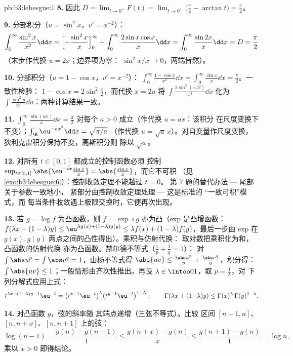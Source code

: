 \begin{solution}{pb:b3:lebesgue:1}
\textbf{8.} 因此 $D = \lim_{t\to0^+}F(t) =
\lim_{t\to0^+}\bigl(\frac\pi2 - \arctan t\bigr) =
\frac\pi2$。

\textbf{9.} 分部积分（$u = \sin^2x$，$v' = x^{-2}$）：
\[
\int_0^\infty\frac{\sin^2x}{x^2}\dd x
= \Bigl[-\frac{\sin^2x}{x}\Bigr]_0^\infty +
\int_0^\infty\frac{2\sin x\cos x}{x}\dd x
= \int_0^\infty\frac{\sin 2x}{x}\dd x = D = \frac\pi2
\]
（末步作代换 $u = 2x$；边界项为零：
$\sin^2 x/x \to 0$，两端皆然）。

\textbf{10.} 分部积分（$u = 1 - \cos x$，$v' = x^{-2}$）：
$\int_0^\infty\frac{1 - \cos x}{x^2}\dd x =
\int_0^\infty\frac{\sin x}x\dd x = \frac\pi2$。一致性检验：
$1 - \cos x = 2\sin^2\frac x2$，而代换 $x = 2u$
将 $\int\frac{2\sin^2(x/2)}{x^2}\dd x$ 化为
$\int\frac{\sin^2u}{u^2}\dd u$：两种计算结果一致。

\textbf{11.} $\int_0^\infty\frac{\sin(ax)}x\dd x = \frac\pi2$
对每个 $a > 0$ 成立（作代换 $u = ax$：该积分
在尺度变换下不变）；$\int_\R\eu^{-ax^2}\dd x = \sqrt{\pi/a}$
（作代换 $u = \sqrt a\,x$）。对自变量作尺度变换，
狄利克雷积分保持不变，高斯积分则
除以 $\sqrt a$。

\textbf{12.} 对所有 $t \in [0,1]$ 都成立的控制函数必须
控制 $\sup_{t\in[0,1]}\abs{\eu^{-tx}\frac{\sin
x}x} = \abs{\frac{\sin x}x}$，而它不可积
（见\cref{exo:b3:lebesgue:6}）：控制收敛定理不能越过 $t = 0$。
第 7 题的替代办法 --- 尾部关于参数一致地小，
紧部分由控制收敛定理处理 --- 这是标准的
“一致可积”模式，而
每当条件收敛遇上极限交换时，它便再次出现。

\textbf{13.} 若 $g = \log f$ 为凸函数，则 $f = \exp\circ g$
亦为凸（exp 是凸增函数：$f(\lambda x + (1-\lambda)
y) \leq \eu^{\lambda g(x) + (1-\lambda)g(y)} \leq \lambda f(x)
+ (1-\lambda)f(y)$，最后一步由 exp 在
$g(x), g(y)$ 两点之间的凸性得出）。乘积与仿射代换：
取对数把乘积化为和，凸函数的仿射代换
亦为凸函数。赫尔德不等式（$\frac1p + \frac1q = 1$）：
对 $\int\abs u^p = \int\abs v^q = 1$，由杨不等式得 $\abs{uv} \leq
\frac{\abs u^p}p + \frac{\abs v^q}q$，积分得：$\int\abs{uv}
\leq 1$；一般情形由齐次性推出。再设 $\lambda
\in \intoo01$，取 $p = \frac1\lambda$，对
下列分解式应用上式：
\[
t^{\lambda x + (1-\lambda)y - 1}\eu^{-t}
= \bigl(t^{x-1}\eu^{-t}\bigr)^{\lambda}
\bigl(t^{y-1}\eu^{-t}\bigr)^{1-\lambda} :
\qquad
\Gamma(\lambda x + (1{-}\lambda)y) \leq
\Gamma(x)^\lambda\,\Gamma(y)^{1-\lambda} .
\]

\textbf{14.} 对凸函数 $g$，弦的斜率随
其端点递增（三弦不等式）。比较
区间 $[n-1, n]$、$[n, n+x]$、$[n, n+1]$ 上的弦：
\[
\log(n-1) = \frac{g(n) - g(n-1)}1 \leq
\frac{g(n+x) - g(n)}x \leq \frac{g(n+1) - g(n)}1 = \log n,
\]
乘以 $x > 0$ 即得结论。


\end{solution}

